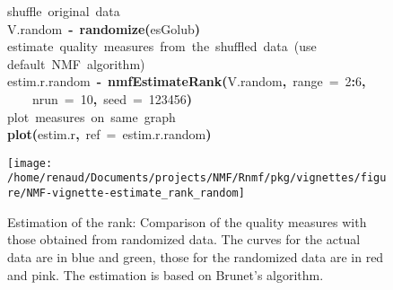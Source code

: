 \documentclass[a4paper]{article}\usepackage{graphicx, color}
\makeatletter
\def\maxwidth{ %
  \ifdim\Gin@nat@width>\linewidth
    \linewidth
  \else
    \Gin@nat@width
  \fi
}
\newcommand{\hlnumber}[1]{\textcolor[rgb]{0,0,0}{#1}}%
\newcommand{\hlfunctioncall}[1]{\textcolor[rgb]{0.501960784313725,0,0.329411764705882}{\textbf{#1}}}%
\newcommand{\hlkeyword}[1]{\textcolor[rgb]{0,0,0}{\textbf{#1}}}%
\newcommand{\hlargument}[1]{\textcolor[rgb]{0.690196078431373,0.250980392156863,0.0196078431372549}{#1}}%
\newcommand{\hlcomment}[1]{\textcolor[rgb]{0.180392156862745,0.6,0.341176470588235}{#1}}%
\newcommand{\hlassignement}[1]{\textcolor[rgb]{0,0,0}{\textbf{#1}}}%
\newcommand{\hlsymbol}[1]{\textcolor[rgb]{0,0,0}{#1}}%
\newcommand{\hlstd}[1]{\textcolor[rgb]{0,0,0}{#1}}%
\newenvironment{kframe}{%
 \def\FrameCommand##1{\hskip\@totalleftmargin \hskip-\fboxsep
 \colorbox{shadecolor}{##1}\hskip-\fboxsep
     \hskip-\linewidth \hskip-\@totalleftmargin \hskip\columnwidth}%
 \MakeFramed {\advance\hsize-\width
   \@totalleftmargin\z@ \linewidth\hsize
   \@setminipage}}%
 {\par\unskip\endMakeFramed}
\newenvironment{knitrout}{}{} %
\makeatother
\begin{document}
\begin{figure}\label{fig:estim_all_rd}
\begin{knitrout}
\color{fgcolor}\begin{kframe}
\begin{flushleft}
\ttfamily\noindent
\hlcomment{\usebox{\hlnormalsizeboxhash}{\ }shuffle{\ }original{\ }data}\hspace*{\fill}\\
\hlstd{}\hlsymbol{V.random}{\ }\hlassignement{\usebox{\hlnormalsizeboxlessthan}-}{\ }\hlfunctioncall{randomize}\hlkeyword{(}\hlsymbol{esGolub}\hlkeyword{)}\hspace*{\fill}\\
\hlstd{}\hlcomment{\usebox{\hlnormalsizeboxhash}{\ }estimate{\ }quality{\ }measures{\ }from{\ }the{\ }shuffled{\ }data{\ }(use}\hspace*{\fill}\\
\hlstd{}\hlcomment{\usebox{\hlnormalsizeboxhash}{\ }default{\ }NMF{\ }algorithm)}\hspace*{\fill}\\
\hlstd{}\hlsymbol{estim.r.random}{\ }\hlassignement{\usebox{\hlnormalsizeboxlessthan}-}{\ }\hlfunctioncall{nmfEstimateRank}\hlkeyword{(}\hlsymbol{V.random}\hlkeyword{,}{\ }\hlargument{range}{\ }\hlargument{=}{\ }\hlnumber{2}\hlkeyword{:}\hlnumber{6}\hlkeyword{,}\hspace*{\fill}\\
\hlstd{}{\ }{\ }{\ }{\ }\hlargument{nrun}{\ }\hlargument{=}{\ }\hlnumber{10}\hlkeyword{,}{\ }\hlargument{seed}{\ }\hlargument{=}{\ }\hlnumber{123456}\hlkeyword{)}\hspace*{\fill}\\
\hlstd{}\hlcomment{\usebox{\hlnormalsizeboxhash}{\ }plot{\ }measures{\ }on{\ }same{\ }graph}\hspace*{\fill}\\
\hlstd{}\hlfunctioncall{plot}\hlkeyword{(}\hlsymbol{estim.r}\hlkeyword{,}{\ }\hlargument{ref}{\ }\hlargument{=}{\ }\hlsymbol{estim.r.random}\hlkeyword{)}\mbox{}
\normalfont
\end{flushleft}
\end{kframe}\texttt{[image: /home/renaud/Documents/projects/NMF/Rnmf/pkg/vignettes/figure/NMF-vignette-estimate\_rank\_random]} 
\end{knitrout}

\caption{Estimation of the rank: Comparison of the quality measures with those obtained from randomized data. 
The curves for the actual data are in blue and green, those for the randomized data are in red and pink. The estimation is based on Brunet's algorithm.}
\end{figure}
\end{document}
